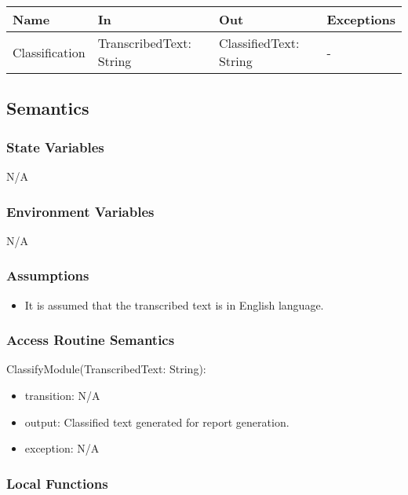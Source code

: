 \documentclass[12pt, titlepage]{article}
\begin{document}
\begin{center}
  \begin{tabular}{p{2.5cm} p{4cm} p{4cm} p{3cm}}  %
  \hline
  \textbf{Name} & \textbf{In} & \textbf{Out} & \textbf{Exceptions} \\
  \hline
  Classification & TranscribedText: String & ClassifiedText: String & - & \\
  \hline
  \end{tabular}
  \end{center}

\subsection{Semantics}

\subsubsection{State Variables}

N/A

\subsubsection{Environment Variables}

N/A

\subsubsection{Assumptions}

\begin{itemize}
  \item It is assumed that the transcribed text is in English language.
\end{itemize}

\subsubsection{Access Routine Semantics}

\noindent ClassifyModule(TranscribedText: String):
\begin{itemize}
\item transition: N/A
\item output: Classified text generated for report generation. 
\item exception: N/A 
\end{itemize}

\subsubsection{Local Functions}
\end{document}
